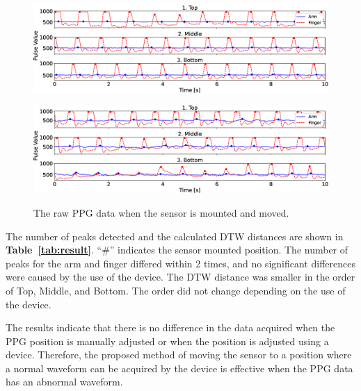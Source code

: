 \documentclass[sigconf, anonymous]{acmart}
\newcommand\tabref[1]{\textbf{Table~\ref{tab:#1}}}
\begin{document}
\begin{figure}[!t]
    \centering
    \begin{minipage}[t]{1\linewidth}
        \centering
        \includegraphics[width=1\linewidth]{figures/manual.eps}
        \label{fig:manual}
    \end{minipage}
    \begin{minipage}[t]{1\linewidth}
        \centering
        \includegraphics[width=1\linewidth]{figures/auto.eps}
        \label{fig:auto}
    \end{minipage}
    \caption{The raw PPG data when the sensor is mounted and moved.}
\end{figure}

The number of peaks detected and the calculated DTW distances are shown in \tabref{result}. ``\#'' indicates the sensor mounted position. The number of peaks for the arm and finger differed within 2 times, and no significant differences were caused by the use of the device. The DTW distance was smaller in the order of Top, Middle, and Bottom. The order did not change depending on the use of the device.\par

The results indicate that there is no difference in the data acquired when the PPG position is manually adjusted or when the position is adjusted using a device. Therefore, the proposed method of moving the sensor to a position where a normal waveform can be acquired by the device is effective when the PPG data has an abnormal waveform.
\end{document}
